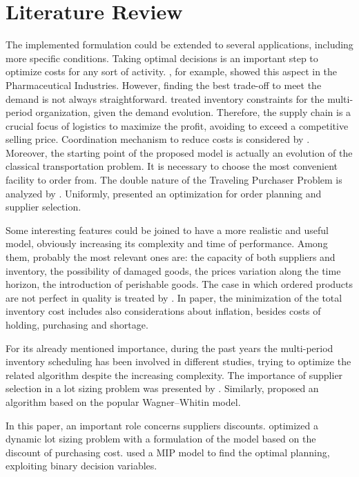 \documentclass{article}
\begin{document}
\section{Literature Review}
The implemented formulation could be extended to several applications, including more specific conditions. Taking optimal decisions is an important step to optimize costs for any sort of activity. \cite{Papageorgiou2001}, for example, showed this aspect in the Pharmaceutical Industries. However, finding the best trade-off to meet the demand is not always straightforward. \cite{James1999} treated inventory constraints for the multi-period organization, given the demand evolution. Therefore, the supply chain is a crucial focus of logistics to maximize the profit, avoiding to exceed a competitive selling price.  Coordination mechanism to reduce costs is considered by \cite{Khouj2003}. Moreover, the starting point of the proposed model is actually an evolution of the classical transportation problem. It is necessary to choose the most convenient facility to order from. The double nature of the Traveling Purchaser Problem is analyzed by \cite{Maner2016}. Uniformly, \cite{Aissa2007} presented an optimization for order planning and supplier selection. \par
Some interesting features could be joined to have a more realistic and useful model, obviously increasing its complexity and time of performance. Among them, probably the most relevant ones are: the capacity of both suppliers and inventory, the possibility of damaged goods, the prices variation along the time horizon, the introduction of perishable goods. The case in which ordered products are not perfect in quality is treated by \cite{Rezae2018}. In \cite{Mousavi2014} paper, the minimization of the total inventory cost includes also considerations about inflation, besides costs of holding, purchasing and shortage. \par
For its already mentioned importance, during the past years the multi-period inventory scheduling has been involved in different studies, trying to optimize the related algorithm despite the increasing complexity. The importance of supplier selection in a lot sizing problem was presented by \cite{Basnet2005}. Similarly, \cite{Vargas2009} proposed an algorithm based on the popular Wagner–Whitin model. \par
In this paper, an important role concerns suppliers discounts. \cite{Khosr2016} optimized a dynamic lot sizing problem with a formulation of the model based on the discount of purchasing cost. \cite{Calle1977} used a MIP model to find the optimal planning, exploiting binary decision variables. \par
\end{document}
